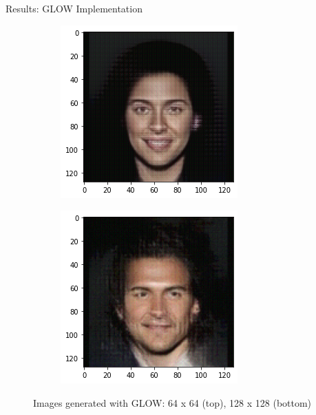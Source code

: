 \begin{frame}{Results: GLOW Implementation}
\begin{figure}[htbp!]
\begin{subfigure}[b]{0.3\textwidth}
     \end{subfigure}
     \hfill
     \begin{subfigure}[b]{0.3\textwidth}
         \centering
         \includegraphics[width=\textwidth]{Images/celeb_sample5.png}
     \end{subfigure}
     \hfill
     \begin{subfigure}[b]{0.3\textwidth}
         \centering
         \includegraphics[width=\textwidth]{Images/celeb_sample6.png}
     \end{subfigure}
     \hfill

     \caption{Images generated with GLOW: 64 x 64 (top), 128 x 128 (bottom)}
\end{figure}
\end{frame}

